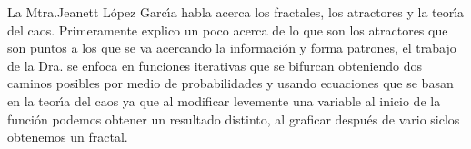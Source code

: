 \documentclass[a4paper,10pt]{article}
\title{}
\author{Allan Ulises Zepeda Ibarra}
\begin{document}
\maketitle

La Mtra.Jeanett L\'opez Garc\'{\i}a habla acerca los fractales, los atractores y la teor\'{\i}a del caos. Primeramente explico un poco acerca de lo que son los atractores
 que son puntos a los que se va acercando la informaci\'on y forma patrones, el trabajo de la Dra. se enfoca en funciones iterativas que 
se bifurcan obteniendo dos caminos posibles por medio de probabilidades y usando ecuaciones que se basan en la teor\'{\i}a del caos ya que al 
modificar levemente una variable al inicio de la funci\'on podemos obtener un resultado distinto, al graficar despu\'es de vario siclos 
obtenemos un fractal.
\end{document}
